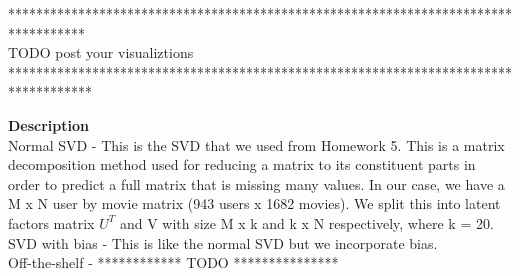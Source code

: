 \noindent************************************************************************************\\
TODO post your visualiztions\\ 
************************************************************************************\\
\begin{center}
\end{center}
\newpage









\noindent\textbf{Description }\\
Normal SVD - This is the SVD that we used from Homework 5. This is a matrix decomposition method used for reducing a matrix to its constituent parts in order to predict a full matrix that is missing many values. In our case, we have a M x N user by movie matrix (943 users x 1682 movies). We split this into latent factors matrix $U^T$ and V with size M x k and k x N respectively, where k = 20. \\
SVD with bias - This is like the normal SVD but we incorporate bias. \\
Off-the-shelf - ************ TODO ***************\\
\\

